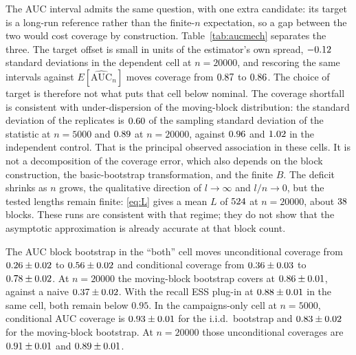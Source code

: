 \documentclass[a4paper,fleqn]{cas-dc}
\newcommand{\tabwidth}{\columnwidth}
\newcommand{\tabbody}{\small\setlength{\tabcolsep}{3.5pt}\renewcommand{\arraystretch}{1.08}}
\newcommand{\fulltab}{\renewcommand{\tabwidth}{\textwidth}\tabbody}
\begin{document}
The AUC interval admits the same question, with one extra candidate: its target is a long-run
reference rather than the finite-$n$ expectation, so a gap between the two would cost coverage by
construction. Table~\ref{tab:aucmech} separates the three. The target offset is small in units of
the estimator's own spread, $-0.12$ standard deviations in the dependent cell at
$n{=}20000$, and rescoring the same intervals against $E[\widehat{\mathrm{AUC}}_n]$ moves coverage
from $0.87$ to $0.86$. The choice of target is therefore not what puts that
cell below nominal. The coverage shortfall is consistent with under-dispersion of the moving-block
distribution: the standard deviation of the replicates is $0.60$ of the sampling
standard deviation of the statistic at $n{=}5000$ and $0.89$ at $n{=}20000$, against
$0.96$ and $1.02$ in the independent control. That is the principal
observed association in these cells. It is not a decomposition of the coverage error, which also
depends on the block construction, the basic-bootstrap transformation, and the finite $B$. The
deficit shrinks as $n$ grows, the qualitative direction of $l\to\infty$ and $l/n\to0$, but the
tested lengths remain finite: \eqref{eq:L} gives a mean $L$ of $524$ at $n{=}20000$, about
$38$ blocks. These runs are consistent with that regime; they do not show that the
asymptotic approximation is already accurate at that block count.
\begin{table}[!t]
\centering
\caption{AUC diagnostics: target offset in units of the sampling standard deviation, the
moving-block bootstrap's spread relative to that standard deviation, and coverage scored against
the reference and against $E[\widehat{\mathrm{AUC}}_n]$. $R{=}300$, $B{=}200$, replicates with an
empty class dropped. From
\texttt{diagnostics/}\allowbreak\texttt{auc\_mechanics.csv}.}\label{tab:aucmech}
\fulltab

\end{table}


The AUC block bootstrap in the ``both'' cell moves unconditional coverage from $0.26\pm0.02$ to
$0.56\pm0.02$ and conditional coverage from $0.36\pm0.03$ to $0.78\pm0.02$. At
$n{=}20000$ the moving-block bootstrap covers at $0.86\pm0.01$, against a naive $0.37\pm0.02$.
With the recall ESS plug-in at $0.88\pm0.01$ in the same cell, both remain below $0.95$. In the
campaigns-only cell at $n{=}5000$, conditional AUC coverage is $0.93\pm0.01$ for the
i.i.d.\ bootstrap and $0.83\pm0.02$ for the moving-block bootstrap. At $n{=}20000$ those
unconditional coverages are $0.91\pm0.01$ and $0.89\pm0.01$.
\end{document}
